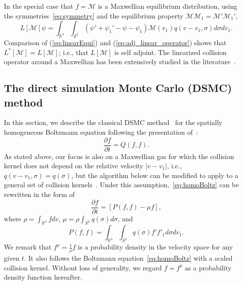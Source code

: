 \documentclass[times,final,nopreprintline]{elsarticle}
\newcommand{\bbR}{\mathbb R} \newcommand{\bbS}{\mathbb S}
\newcommand{\cM}{\mathcal M} \newcommand{\cN}{\mathcal N}
\newcommand{\cS}{\mathcal S} \newcommand{\cT}{\mathcal T}
\newcommand{\Rthree}{{\bbR^3}}
\newcommand{\Stwo}{{\cS^2}}
\begin{document}
In the special case that $f=\mathcal{M}$ is a Maxwellian equilibrium distribution, using the symmetries~\eqref{eq:symmetry} and the equilibrium property $\cM\cM_1 = \cM'\cM_1'$,
\begin{equation}
L[\cM]  \psi = \int_\Rthree \int_\Stwo (\psi' + \psi_1' -\psi-\psi_1 )\cM(v_1)q(v-v_1,\sigma) d\sigma dv_1. \label{eq:linearEqui}
\end{equation}
Comparison of (\ref{eq:linearEqui}) and (\ref{eq:adj_linear_operator}) shows that $L^*[\cM]=L[\cM]$; i.e., that $L[\cM]$ is self adjoint.
The linearized collision operator around a Maxwellian has been extensively studied in the literature~\cite{cercignani1969mathematical,villani2002review,bobylev2008some}.






\subsection{The direct simulation Monte Carlo (DSMC) method} %
In this section, we describe the classical DSMC method~\cite{bird1970direct} for the spatially homogeneous Boltzmann equation following the presentation of~\cite{pareschi2001introduction}:
\begin{equation}\label{eq:homoBoltz}
    \frac{\partial f}{\partial t}  =  Q(f,f).
\end{equation}
As stated above, our focus is also on a Maxwellian gas for which the collision kernel does not depend on the relative velocity $|v-v_1|$, i.e., $q(v-v_1,\sigma) = q(\sigma)$, but the algorithm below can be  modified to apply to a general set of collision kernels~\cite{bird1970direct,pareschi2001introduction}. Under this assumption,~\eqref{eq:homoBoltz} can be rewritten in the form of 
\begin{equation}\label{eq:homoBoltz_DSMC_1}
    \frac{\partial f}{\partial t} =  [P(f,f) - \mu f],
\end{equation}
where $\rho = \int_\Rthree f dv$, $\mu = \rho \int_\Stwo q(\sigma)d\sigma$, and
\begin{equation*} %
    P(f,f) = \int_\Rthree\int_\Stwo q(\sigma) f'f'_1  d\sigma dv_1.
\end{equation*}
We remark that $f^\rho = \frac{1}{\rho}f$ is a probability density in the velocity space for any given $t$. It also follows the Boltzmann equation~\eqref{eq:homoBoltz} with a scaled collision kernel. Without loss of generality, we regard $f = f^\rho$ as a probability density function hereafter.
\end{document}

